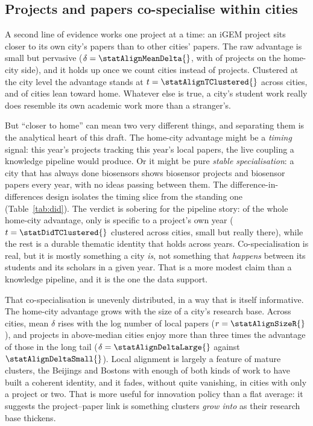\documentclass[12pt,a4paper]{article}
\begin{document}
	\subsection{Projects and papers co-specialise within cities}
	
	A second line of evidence works one project at a time: an iGEM project sits closer
	to its own city's papers than to other cities' papers. The raw advantage is small
	but pervasive ($\delta = \statAlignMeanDelta{}$, with \statAlignFracPos{} of
	projects on the home-city side), and it holds up once we count cities instead of
	projects. Clustered at the city level the advantage stands at
	$t = \statAlignTClustered{}$ across \statAlignNCities{} cities, and
	\statAlignFracCitiesPos{} of cities lean toward home. Whatever else is true, a
	city's student work really does resemble its own academic work more than a
	stranger's.
	
	But ``closer to home'' can mean two very different things, and separating them is
	the analytical heart of this draft. The home-city advantage might be a
	\textit{timing} signal: this year's projects tracking this year's local papers, the
	live coupling a knowledge pipeline would produce. Or it might be pure
	\textit{stable specialisation}: a city that has always done biosensors shows
	biosensor projects and biosensor papers every year, with no ideas passing between
	them. The difference-in-differences design isolates the timing slice from the
	standing one (Table~\ref{tab:did}). The verdict is sobering for the pipeline story:
	of the whole home-city advantage, only \statDidEstimate{} is specific to a
	project's own year ($t = \statDidTClustered{}$ clustered across \statDidNCities{}
	cities, small but really there), while the rest is a durable thematic identity that
	holds across years. Co-specialisation is real, but it is mostly something a city
	\textit{is}, not something that \textit{happens} between its students and its
	scholars in a given year. That is a more modest claim than a knowledge pipeline,
	and it is the one the data support.
	
	That co-specialisation is unevenly distributed, in a way that is itself
	informative. The home-city advantage grows with the size of a city's research
	base. Across cities, mean $\delta$ rises with the log number of local papers
	($r = \statAlignSizeR{}$), and projects in above-median cities enjoy more than
	three times the advantage of those in the long tail ($\delta =
	\statAlignDeltaLarge{}$ against $\statAlignDeltaSmall{}$). Local alignment is
	largely a feature of mature clusters, the Beijings and Bostons with enough of both
	kinds of work to have built a coherent identity, and it fades, without quite
	vanishing, in cities with only a project or two. That is more useful for innovation
	policy than a flat average: it suggests the project--paper link is something
	clusters \textit{grow into} as their research base thickens.
	
\end{document}
